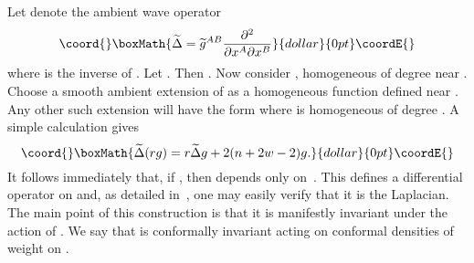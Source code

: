 \documentclass[a4paper,12pt]{amsart}
\begin{document}
Let \myHighlight{$\widetilde\Delta$}\coordHE{} denote the ambient wave operator
$$\coord{}\boxMath{\widetilde\Delta=
\widetilde g^{AB}\frac{\partial^2}{\partial x^A\partial x^B}}{dollar}{0pt}\coordE{}$$
where \coordHE{} is the inverse of \coordHE{}. Let
\coordHE{}. Then \mbox{\coordHE{}}. Now consider
\coordHE{}, homogeneous of degree \coordHE{} near \coordHE{}. Choose a smooth
ambient extension \coordHE{} of \coordHE{} as a homogeneous function defined near
\coordHE{}. Any other such extension will have the form
\coordHE{} where \coordHE{} is homogeneous of degree \coordHE{}. A simple
calculation gives
$$\coord{}\boxMath{\widetilde\Delta(rg)=r\widetilde\Delta g+2(n+2w-2)g.}{dollar}{0pt}\coordE{}$$
It follows immediately that, if \coordHE{}, then
\coordHE{} depends only on~\coordHE{}. This defines
a differential operator on \coordHE{} and, as detailed in~\cite{eg}, one
may easily verify that it is the Laplacian. The main point of this construction
is that it is manifestly invariant under the action of \coordHE{}.
We say that \myHighlight{$\Delta$}\coordHE{} is conformally invariant acting on conformal densities of
weight \coordHE{} on \coordHE{}.
\end{document}
